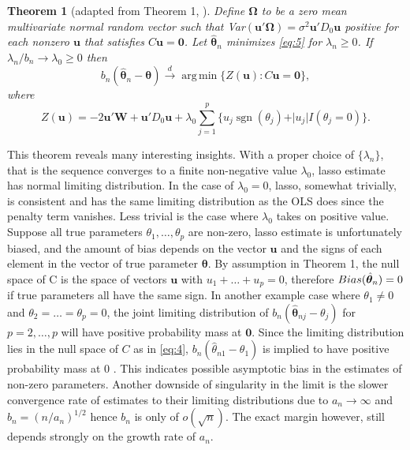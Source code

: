 \documentclass[12pt,a4paper]{article}
\DeclareMathOperator*{\argmin}{arg\,min} %
\DeclareMathOperator*{\sgn}{sgn} %
\newtheorem{theorem}{Theorem} %
\begin{document}
\begin{theorem} [adapted from Theorem 1, \cite{knight2008shrinkage}]
	Define $ \bm{\Omega} $ to be a zero mean multivariate normal random vector such that {\normalfont Var}$ (\bm{u}'\bm{\Omega}) = \sigma^2\bm{u}'D_0\bm{u} $ positive for each nonzero $ \bm{u} $ that satisfies $ C\bm{u} = \bm{0} $. Let $ \hat{\bm{\theta}}_n $ minimizes \eqref{eq:5} for $ \lambda_n \geq 0$. If $ \lambda_n/b_n \rightarrow \lambda_0 \geq 0 $ then
	\[
	b_n(\hat{\bm{\theta}}_n - \bm{\theta}) \overset{d}{\longrightarrow} 
	\argmin\{Z(\bm{u}):C\bm{u} = \bm{0}\},
	\] where \[
	Z(\bm{u}) = -2\bm{u}'\bm{W} + \bm{u}'D_0\bm{u} +
	\lambda_0\sum_{j = 1}^p\{u_j\sgn(\theta_j) + \vert u_j\vert I(\theta_j = 0)\}.
	\]
\end{theorem}
This theorem reveals many interesting insights. With a proper choice of $ \{\lambda_n\} $, that is the sequence converges to a finite non-negative value $ \lambda_0 $, lasso estimate has normal limiting distribution. In the case of $ \lambda_0 = 0 $, lasso, somewhat trivially, is consistent and has the same limiting distribution as the OLS does since the penalty term vanishes. Less trivial is the case where $ \lambda_0 $ takes on positive value. Suppose all true parameters $ \theta_1, \ldots, \theta_p $ are non-zero, lasso estimate is unfortunately biased, and the amount of bias  depends on the vector $ \bm{u} $ and the signs of each element in the vector of true parameter $ \bm{\theta} $. By assumption in Theorem 1, the null space of C is the space of vectors $ \bm{u} $ with $ u_1 + \ldots + u_p = 0 $, therefore $ {\normalfont Bias}(\hat{\bm{\theta}}_n) = 0 $ if true parameters all have the same sign. In another example case where $ \theta_1 \neq 0 $ and $ \theta_2 = \ldots = \theta_p = 0 $, the joint limiting distribution of $ b_n(\hat{\bm{\theta}}_{nj} - \theta_j) $ for $ p = 2, \ldots, p $ will have positive probability mass at $ \bm{0} $. Since the limiting distribution lies in the null space of $ C $ as in \eqref{eq:4}, $ b_n(\hat{\theta}_{n1} - \theta_1) $ is implied to have positive probability mass at 0 \citep{knight2008shrinkage}. This indicates possible asymptotic bias in the estimates of non-zero parameters. Another downside of singularity in the limit is the slower convergence rate of estimates to their limiting distributions due to $ a_n \rightarrow \infty $ and $ b_n = (n/a_n)^{1/2} $ hence $ b_n $ is only of $ o(\sqrt{n}) $. The exact margin however, still depends strongly on the growth rate of $ a_n $.
\end{document}
